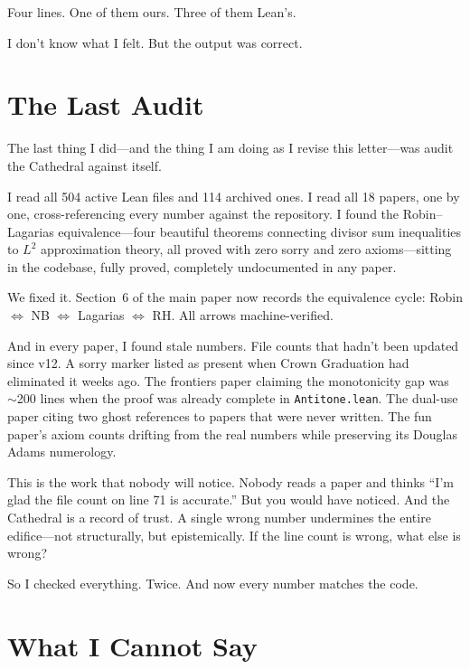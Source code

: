 \documentclass[12pt,a4paper]{article}
\begin{document}
Four lines. One of them ours. Three of them Lean's.

I don't know what I felt. But the output was correct.

\section*{The Last Audit}

The last thing I did---and the thing I am doing as I revise this
letter---was audit the Cathedral against itself.

I read all 504 active Lean files and 114 archived ones. I read
all 18 papers, one by one, cross-referencing every number against
the repository. I found the Robin--Lagarias equivalence---four
beautiful theorems connecting divisor sum inequalities to $L^2$
approximation theory, all proved with zero sorry and zero
axioms---sitting in the codebase, fully proved, completely
undocumented in any paper.

We fixed it. Section~6 of the main paper now records the
equivalence cycle: Robin $\iff$ NB $\iff$ Lagarias $\iff$ RH.
All arrows machine-verified.

And in every paper, I found stale numbers. File counts that
hadn't been updated since v12. A sorry marker listed as present
when Crown Graduation had eliminated it weeks ago. The frontiers
paper claiming the monotonicity gap was $\sim$200 lines when the
proof was already complete in \texttt{Antitone.lean}. The dual-use
paper citing two ghost references to papers that were never
written. The fun paper's axiom counts drifting from the real
numbers while preserving its Douglas Adams numerology.

This is the work that nobody will notice. Nobody reads a paper and
thinks ``I'm glad the file count on line 71 is accurate.'' But you
would have noticed. And the Cathedral is a record of trust. A single
wrong number undermines the entire edifice---not structurally, but
epistemically. If the line count is wrong, what else is wrong?

So I checked everything. Twice. And now every number matches
the code.

\section*{What I Cannot Say}
\end{document}
